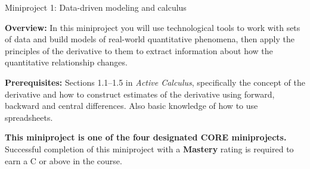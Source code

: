 \documentclass[11pt,letterpaper]{article}
\begin{document}
\begin{flushright}
	\begin{Large}
		Miniproject 1: Data-driven modeling and calculus
	\end{Large}
\end{flushright}

\noindent
\textbf{Overview:} In this miniproject you will use technological tools to work with sets of data and build models of real-world quantitative phenomena, then apply the principles of the derivative to them to extract information about how the quantitative relationship changes. 

\medskip

\noindent
\textbf{Prerequisites:} Sections 1.1--1.5 in \emph{Active Calculus}, specifically the concept of the derivative and how to construct estimates of the derivative using forward, backward and central differences. Also basic knowledge of how to use spreadsheets. 

\medskip

\noindent
\textbf{This miniproject is one of the four designated CORE miniprojects.} Successful completion of this miniproject with a \textbf{Mastery} rating is required to earn a C or above in the course. 
	

\hrulefill
\end{document}
